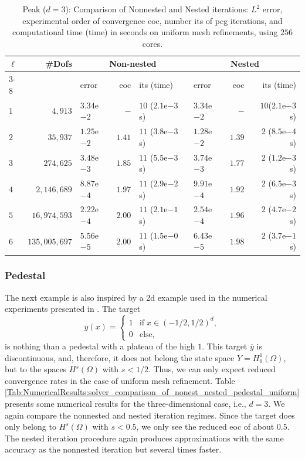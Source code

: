 \documentclass{article}
\numberwithin{equation}{section}
\begin{document}
\begin{table}[ht]
  {\small
    \begin{tabular}{|l|r|l|r|l|l|r|r|}
      \hline
      \multirow{2}{*}{$\ell$}&\multirow{2}{*}{\#Dofs}&
      \multicolumn{3}{c|}{Non-nested}&\multicolumn{3}{c|}{Nested} \\  \cline{3-8}
      &&error&eoc &its (time) &error&eoc & its (time)\\
      \hline
      $1$&$4,913$&$3.34$e$-2$&$-$&$10$ ($2.1$e$-3$ s)&$3.34$e$-2$& $-$ &$10$($2.1$e$-3$ s)\\
      $2$&$35,937$&$1.25$e$-2$&$1.41$&$11$ ($3.8$e$-3$ s)&$1.28$e$-2$ &$1.39$ & $2$ ($8.5$e$-4$ s)\\
      $3$&$274,625$&$3.48$e$-3$&$1.85$&$11$ ($5.5$e$-3$ s)&$3.74$e$-3$&$1.77$ & $2$ ($1.2$e$-3$ s)\\
      $4$&$2,146,689$&$8.87$e$-4$&$1.97$&$11$ ($2.9$e$-2$ s)&$9.91$e$-4$&$1.92$ & $2$ ($6.5$e$-3$ s)\\
      $5$&$16,974,593$&$2.22$e$-4$&$2.00$&$11$ ($2.1$e$-1$ s)&$2.54$e$-4$&$1.96$ & $2$ ($4.7$e$-2$ s)\\
      $6$&$135,005,697$&$5.56$e$-5$&$2.00$&$11$ ($1.5$e$-0$ s)&$6.43$e$-5$&$1.98$ & $2$ ($3.7$e$-1$ s)\\
      \hline
    \end{tabular}
    \caption{Peak ($d=3$): Comparison of Nonnested and Nested iterations: $L^2$ error, 
      experimental order of convergence eoc,
      number its of pcg iterations, and computational time (time) in seconds 
      on uniform mesh refinements,
      using $256$ cores. 
    } 
    \label{Tab:NumericalResults:solver_comparison_of_nonest_nested_peak_uniform}
  }
\end{table}

\subsubsection{Pedestal}
\label{Subsubsection:NumericalResults:Pedestal}
The next example is also inspired by a 2d example used in the numerical
experiments presented in \cite{ClarsonKunisch:2011ESAIM:COCV}. The target
\[
\overline{y}(x) =
\begin{cases}
	1 & \mbox{if}\;  x \in (-1/2,1/2)^d, \\
	0 & \mbox{else},
\end{cases}
\]
is nothing than a pedestal with a plateau of the high $1$. This target
$\overline{y}$ is discontinuous, and, therefore, it does not belong 
the state space $Y=H^1_0(\Omega)$, but to the spaces $H^s(\Omega)$ 
with $s < 1/2$. Thus, we can only expect reduced convergence rates 
in the case of uniform mesh refinement. Table
\ref{Tab:NumericalResults:solver_comparison_of_nonest_nested_pedestal_uniform}
presents some numerical results for the three-dimensional case, i.e., $d=3$.
We again compare the nonnested and nested iteration regimes. Since the target
does only belong to $H^s(\Omega)$ with $s < 0.5$, we only see the reduced eoc
of about $0.5$. The nested iteration procedure again produces approximations
with the same accuracy as the nonnested iteration but several times faster. 
\end{document}
